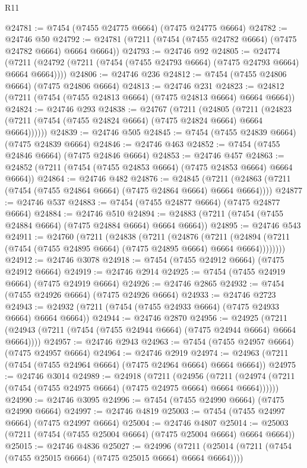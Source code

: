 \begin{lexlean}{R11}
\begin{coremodule}
@24781 := @7454 (@7455 @24775 @6664) (@7475 @24775 @6664)
@24782 := @24746 @50
@24792 := @24781 (@7211 (@7454 (@7455 @24782 @6664) (@7475 @24782 @6664) @6664 @6664))
@24793 := @24746 @92
@24805 := @24774
    (@7211 (@24792 (@7211 (@7454 (@7455 @24793 @6664) (@7475 @24793 @6664) @6664 @6664))))
@24806 := @24746 @236
@24812 := @7454 (@7455 @24806 @6664) (@7475 @24806 @6664)
@24813 := @24746 @231
@24823 := @24812 (@7211 (@7454 (@7455 @24813 @6664) (@7475 @24813 @6664) @6664 @6664))
@24824 := @24746 @293
@24838 := @24767
    (@7211
      (@24805
        (@7211 (@24823 (@7211 (@7454 (@7455 @24824 @6664) (@7475 @24824 @6664) @6664 @6664))))))
@24839 := @24746 @505
@24845 := @7454 (@7455 @24839 @6664) (@7475 @24839 @6664)
@24846 := @24746 @463
@24852 := @7454 (@7455 @24846 @6664) (@7475 @24846 @6664)
@24853 := @24746 @457
@24863 := @24852 (@7211 (@7454 (@7455 @24853 @6664) (@7475 @24853 @6664) @6664 @6664))
@24864 := @24746 @482
@24876 := @24845
    (@7211 (@24863 (@7211 (@7454 (@7455 @24864 @6664) (@7475 @24864 @6664) @6664 @6664))))
@24877 := @24746 @537
@24883 := @7454 (@7455 @24877 @6664) (@7475 @24877 @6664)
@24884 := @24746 @510
@24894 := @24883 (@7211 (@7454 (@7455 @24884 @6664) (@7475 @24884 @6664) @6664 @6664))
@24895 := @24746 @543
@24911 := @24760
    (@7211
      (@24838
        (@7211
          (@24876
            (@7211
              (@24894 (@7211 (@7454 (@7455 @24895 @6664) (@7475 @24895 @6664) @6664 @6664))))))))
@24912 := @24746 @3078
@24918 := @7454 (@7455 @24912 @6664) (@7475 @24912 @6664)
@24919 := @24746 @2914
@24925 := @7454 (@7455 @24919 @6664) (@7475 @24919 @6664)
@24926 := @24746 @2865
@24932 := @7454 (@7455 @24926 @6664) (@7475 @24926 @6664)
@24933 := @24746 @2723
@24943 := @24932 (@7211 (@7454 (@7455 @24933 @6664) (@7475 @24933 @6664) @6664 @6664))
@24944 := @24746 @2870
@24956 := @24925
    (@7211 (@24943 (@7211 (@7454 (@7455 @24944 @6664) (@7475 @24944 @6664) @6664 @6664))))
@24957 := @24746 @2943
@24963 := @7454 (@7455 @24957 @6664) (@7475 @24957 @6664)
@24964 := @24746 @2919
@24974 := @24963 (@7211 (@7454 (@7455 @24964 @6664) (@7475 @24964 @6664) @6664 @6664))
@24975 := @24746 @3014
@24989 := @24918
    (@7211
      (@24956
        (@7211 (@24974 (@7211 (@7454 (@7455 @24975 @6664) (@7475 @24975 @6664) @6664 @6664))))))
@24990 := @24746 @3095
@24996 := @7454 (@7455 @24990 @6664) (@7475 @24990 @6664)
@24997 := @24746 @4819
@25003 := @7454 (@7455 @24997 @6664) (@7475 @24997 @6664)
@25004 := @24746 @4807
@25014 := @25003 (@7211 (@7454 (@7455 @25004 @6664) (@7475 @25004 @6664) @6664 @6664))
@25015 := @24746 @4836
@25027 := @24996
    (@7211 (@25014 (@7211 (@7454 (@7455 @25015 @6664) (@7475 @25015 @6664) @6664 @6664))))

\end{coremodule}
\end{lexlean}
